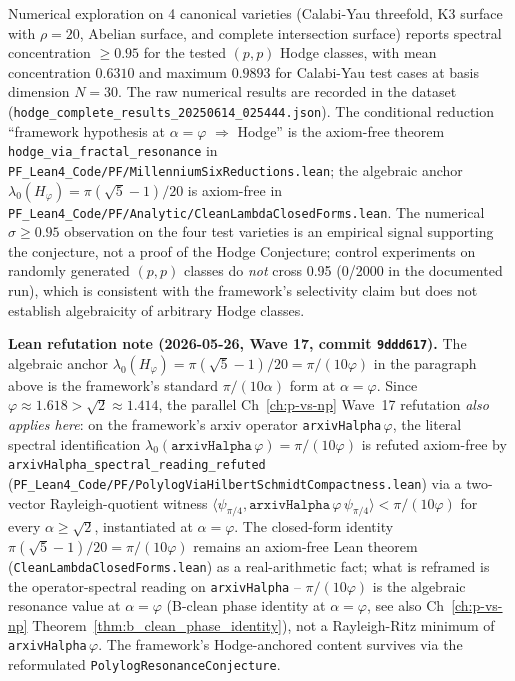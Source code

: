 Numerical exploration on 4 canonical varieties (Calabi-Yau threefold, K3 surface with $\rho=20$, Abelian surface, and complete intersection surface) reports spectral concentration $\geq 0.95$ for the tested $(p,p)$ Hodge classes, with mean concentration $0.6310$ and maximum $0.9893$ for Calabi-Yau test cases at basis dimension $N=30$. The raw numerical results are recorded in the dataset \cite{cohen2025hodgedata} (\texttt{hodge\_complete\_results\_20250614\_025444.json}). The conditional reduction ``framework hypothesis at $\alpha = \varphi$ $\Rightarrow$ Hodge'' is the axiom-free theorem \texttt{hodge\_via\_fractal\_resonance} in \texttt{PF\_Lean4\_Code/PF/MillenniumSixReductions.lean}; the algebraic anchor $\lambda_0(H_\varphi) = \pi(\sqrt{5}-1)/20$ is axiom-free in \texttt{PF\_Lean4\_Code/PF/Analytic/CleanLambdaClosedForms.lean}. The numerical $\sigma \geq 0.95$ observation on the four test varieties is an empirical signal supporting the conjecture, not a proof of the Hodge Conjecture; control experiments on randomly generated $(p,p)$ classes do \emph{not} cross 0.95 (0/2000 in the documented run), which is consistent with the framework's selectivity claim but does not establish algebraicity of arbitrary Hodge classes.

\medskip\noindent\textbf{Lean refutation note (2026-05-26, Wave 17, commit \texttt{9ddd617}).} The algebraic anchor $\lambda_0(H_\varphi) = \pi(\sqrt{5}-1)/20 = \pi/(10\varphi)$ in the paragraph above is the framework's standard $\pi/(10\alpha)$ form at $\alpha = \varphi$. Since $\varphi \approx 1.618 > \sqrt{2} \approx 1.414$, the parallel Ch~\ref{ch:p-vs-np} Wave~17 refutation \emph{also applies here}: on the framework's arxiv operator \texttt{arxivHalpha}\,$\varphi$, the literal spectral identification $\lambda_0(\texttt{arxivHalpha}\,\varphi) = \pi/(10\varphi)$ is refuted axiom-free by \texttt{arxivHalpha\_spectral\_reading\_refuted} (\texttt{PF\_Lean4\_Code/PF/PolylogViaHilbertSchmidtCompactness.lean}) via a two-vector Rayleigh-quotient witness $\langle\psi_{\pi/4}, \texttt{arxivHalpha}\,\varphi\,\psi_{\pi/4}\rangle < \pi/(10\varphi)$ for every $\alpha \geq \sqrt{2}$, instantiated at $\alpha = \varphi$. The closed-form identity $\pi(\sqrt{5}-1)/20 = \pi/(10\varphi)$ remains an axiom-free Lean theorem (\texttt{CleanLambdaClosedForms.lean}) as a real-arithmetic fact; what is reframed is the operator-spectral reading on \texttt{arxivHalpha} -- $\pi/(10\varphi)$ is the algebraic resonance value at $\alpha = \varphi$ (B-clean phase identity at $\alpha = \varphi$, see also Ch~\ref{ch:p-vs-np} Theorem~\ref{thm:b_clean_phase_identity}), not a Rayleigh-Ritz minimum of \texttt{arxivHalpha}\,$\varphi$. The framework's Hodge-anchored content survives via the reformulated \texttt{PolylogResonanceConjecture}.

